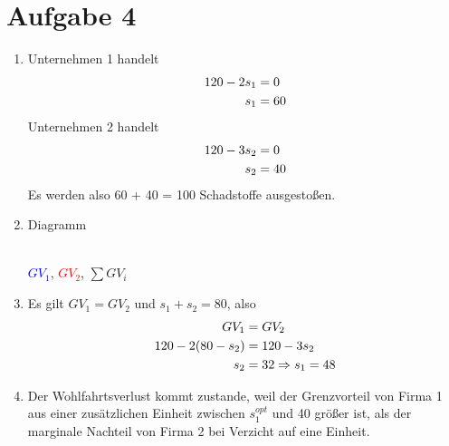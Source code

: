 \documentclass{article}
\begin{document}
	\section*{Aufgabe 4}
	\begin{enumerate}[label=(\alph*)]
		\item Unternehmen 1 handelt
		\begin{align}
			120-2s_1 &= 0 \notag \\
			s_1 &= 60 \notag
		\end{align}
		Unternehmen 2 handelt
		\begin{align}
			120-3s_2 &= 0 \notag \\
			s_2 &= 40 \notag
		\end{align}
		Es werden also 60 + 40 = 100 Schadstoffe ausgestoßen.
		\item Diagramm
		\begin{center}
			 \\
			\textcolor{blue}{$GV_1$}, \textcolor{red}{$GV_2$}, \textcolor{green!80!black}{$\sum GV_i$}
		\end{center}
		\item Es gilt $GV_1=GV_2$ und $s_1+s_2=80$, also
		\begin{align}
			GV_1 &= GV_2 \notag \\
			120-2(80-s_2) &= 120-3s_2 \notag \\
			s_2 &= 32 \Rightarrow s_1 = 48 \notag
		\end{align}
		\item Der Wohlfahrtsverlust kommt zustande, weil der Grenzvorteil von Firma 1 aus einer zusätzlichen Einheit zwischen $s_1^{opt}$ und 40 größer ist, als der marginale Nachteil von Firma 2 bei Verzicht auf eine Einheit.
		\begin{center}
\end{center}
\end{enumerate}
\end{document}

